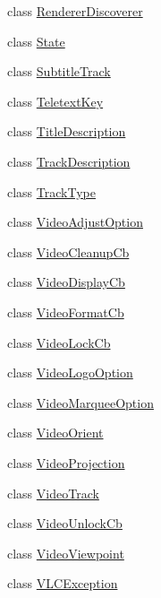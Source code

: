 \begin{DoxyCompactItemize}
class \hyperlink{classvlc_1_1_renderer_discoverer}{Renderer\+Discoverer}
\item 
class \hyperlink{classvlc_1_1_state}{State}
\item 
class \hyperlink{classvlc_1_1_subtitle_track}{Subtitle\+Track}
\item 
class \hyperlink{classvlc_1_1_teletext_key}{Teletext\+Key}
\item 
class \hyperlink{classvlc_1_1_title_description}{Title\+Description}
\item 
class \hyperlink{classvlc_1_1_track_description}{Track\+Description}
\item 
class \hyperlink{classvlc_1_1_track_type}{Track\+Type}
\item 
class \hyperlink{classvlc_1_1_video_adjust_option}{Video\+Adjust\+Option}
\item 
class \hyperlink{classvlc_1_1_video_cleanup_cb}{Video\+Cleanup\+Cb}
\item 
class \hyperlink{classvlc_1_1_video_display_cb}{Video\+Display\+Cb}
\item 
class \hyperlink{classvlc_1_1_video_format_cb}{Video\+Format\+Cb}
\item 
class \hyperlink{classvlc_1_1_video_lock_cb}{Video\+Lock\+Cb}
\item 
class \hyperlink{classvlc_1_1_video_logo_option}{Video\+Logo\+Option}
\item 
class \hyperlink{classvlc_1_1_video_marquee_option}{Video\+Marquee\+Option}
\item 
class \hyperlink{classvlc_1_1_video_orient}{Video\+Orient}
\item 
class \hyperlink{classvlc_1_1_video_projection}{Video\+Projection}
\item 
class \hyperlink{classvlc_1_1_video_track}{Video\+Track}
\item 
class \hyperlink{classvlc_1_1_video_unlock_cb}{Video\+Unlock\+Cb}
\item 
class \hyperlink{classvlc_1_1_video_viewpoint}{Video\+Viewpoint}
\item 
class \hyperlink{classvlc_1_1_v_l_c_exception}{V\+L\+C\+Exception}
\end{DoxyCompactItemize}
